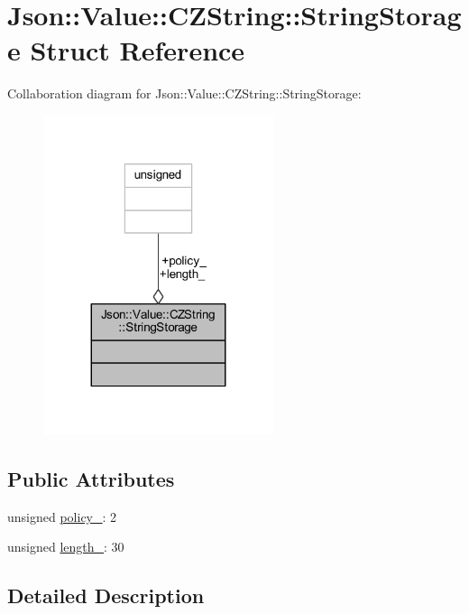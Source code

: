 \hypertarget{struct_json_1_1_value_1_1_c_z_string_1_1_string_storage}{}\section{Json\+:\+:Value\+:\+:C\+Z\+String\+:\+:String\+Storage Struct Reference}
\label{struct_json_1_1_value_1_1_c_z_string_1_1_string_storage}


Collaboration diagram for Json\+:\+:Value\+:\+:C\+Z\+String\+:\+:String\+Storage\+:\nopagebreak
\begin{figure}[H]
\begin{center}
\leavevmode
\includegraphics[width=191pt]{struct_json_1_1_value_1_1_c_z_string_1_1_string_storage__coll__graph}
\end{center}
\end{figure}
\subsection*{Public Attributes}
\begin{DoxyCompactItemize}
\item 
unsigned \hyperlink{struct_json_1_1_value_1_1_c_z_string_1_1_string_storage_a7f68c8d6197c5692a525854b5f29f87b}{policy\+\_\+}\+: 2
\item 
unsigned \hyperlink{struct_json_1_1_value_1_1_c_z_string_1_1_string_storage_a165d865c44e6471d34668eeb4f15b140}{length\+\_\+}\+: 30
\end{DoxyCompactItemize}


\subsection{Detailed Description}


